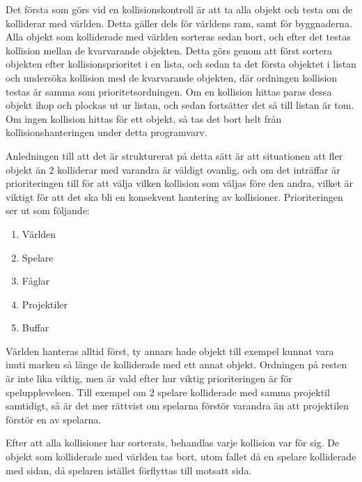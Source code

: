 \documentclass[12pt,a4paper]{article}
\begin{document}
\vspace{0.2cm}

Det första som görs vid en kollisionskontroll är att ta alla objekt och testa om de kolliderar med världen. Detta gäller dels för världens ram, samt för byggnaderna. Alla objekt som kolliderade med världen sorteras sedan bort, och efter det testas kollision mellan de kvarvarande objekten. Detta görs genom att först sortera objekten efter kollisionsprioritet i en lista, och sedan ta det första objektet i listan och undersöka kollision med de kvarvarande objekten, där ordningen kollision testas är samma som prioritetsordningen. Om en kollision hittas paras dessa objekt ihop och plockas ut ur listan, och sedan fortsätter det så till listan är tom. Om ingen kollision hittas för ett objekt, så tas det bort helt från kollisionshanteringen under detta programvarv.

\vspace{0.2cm}
 
Anledningen till att det är strukturerat på detta sätt är att situationen att fler objekt än 2 kolliderar med varandra är väldigt ovanlig, och om det inträffar är prioriteringen till för att välja vilken kollision som väljas före den andra, vilket är viktigt för att det ska bli en konsekvent hantering av kollisioner. Prioriteringen ser ut som följande:

\begin{enumerate}
	\item Världen
	
	\item Spelare
	
	\item Fåglar
	
	\item Projektiler
	
	\item Buffar	
\end{enumerate}

Världen hanteras alltid först, ty annars hade objekt till exempel kunnat vara inuti marken så länge de kolliderade med ett annat objekt. Ordningen på resten är inte lika viktig, men är vald efter hur viktig prioriteringen är för spelupplevelsen. Till exempel om 2 spelare kolliderade med samma projektil samtidigt, så är det mer rättvist om spelarna förstör varandra än att projektilen förstör en av spelarna.

\vspace{0.2cm}

Efter att alla kollisioner har sorterats, behandlas varje kollision var för sig. De objekt som kolliderade med världen tas bort, utom fallet då en spelare kolliderade med sidan, då spelaren istället förflyttas till motsatt sida.
\end{document}
